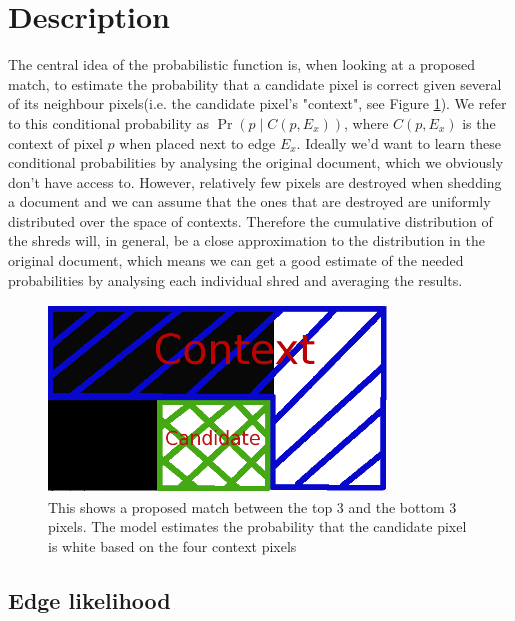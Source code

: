\section{Description}

The central idea of the probabilistic function is, when looking at a proposed match, to estimate the probability that a candidate pixel is correct given several of its neighbour pixels(i.e. the candidate pixel's "context", see Figure \ref{fig:probContext}). We refer to this conditional probability as \(\Pr( p \mid C(p,E_x) )\), where \(C(p,E_x)\) is the context of pixel $p$ when placed next to edge $E_x$. Ideally we'd want to learn these conditional probabilities by analysing the original document, which we obviously don't have access to. However, relatively few pixels are destroyed when shedding a document and we can assume that the ones that are destroyed are uniformly distributed over the space of contexts. Therefore the cumulative distribution of the shreds will, in general, be a close approximation to the distribution in the original document, which means we can get a good estimate of the needed probabilities by analysing each individual shred and averaging the results.

\begin{figure}[h]
\centering
\includegraphics[width=0.8\textwidth,height=5cm]{context}
\caption{This shows a proposed match between the top 3 and the bottom 3 pixels. The model estimates the probability that the candidate pixel is white based on the four context pixels}
\label{fig:probContext}
\end{figure}

\subsection{Edge likelihood}

